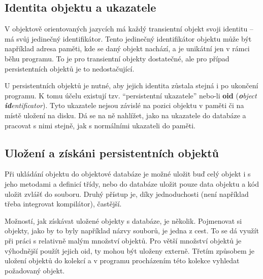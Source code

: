 \subsection{Identita objektu a ukazatele}
V objektově orientovaných jazycích má každý transientní objekt svoji identitu -- má svůj jedinečný identifikátor. Tento jedinečný identifikátor objektu může být například adresa paměti, kde se daný objekt nachází, a je unikátní jen v rámci běhu programu. To je pro transientní objekty dostatečné, ale pro případ persistentních objektů je to nedostačující.

U persistentních objektů je nutné, aby jejich identita zůstala stejná i po ukončení programu. K tomu účelu existují tzv. "`persistentní ukazatele"' nebo-li \textbf{oid} (\textit{\textbf{o}bject \textbf{id}entificator}). Tyto ukazatele nejsou závislé na pozici objektu v paměti či na místě uložení na disku. Dá se na ně nahlížet, jako na ukazatele do databáze a pracovat s nimi stejně, jak s normálními ukazateli do paměti.

\subsection{Uložení a získáni persistentních objektů}
Při ukládání objektu do objektové databáze je možné uložit buď celý objekt i s jeho metodami a definicí třídy, nebo do databáze uložit pouze data objektu a kód uložit zvlášť do souboru. Druhý přístup je, díky jednoduchosti (není například třeba integrovat kompilátor), častější.

Možností, jak získávat uložené objekty s databáze, je několik. Pojmenovat si objekty, jako by to byly například názvy souborů, je jedna z cest. To se dá využít při práci s relativně malým množství objektů. Pro větší množství objektů je výhodnější použít jejich oid, ty mohou být uloženy externě. Třetím způsobem je uložení objektů do kolekcí a v programu procházením této kolekce vyhledat požadovaný objekt. 

